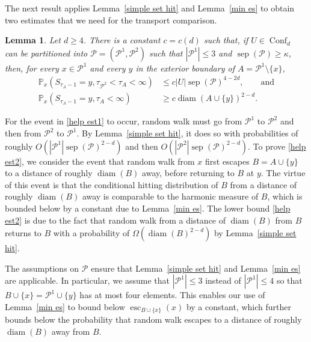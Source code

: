 \documentclass[11pt,reqno]{amsart}
\newtheorem{lemma}{Lemma}[section]
\theoremstyle{definition}
\numberwithin{equation}{section}
\renewcommand{\P}{\mathbb{P}}
\newcommand{\1}{\mathbf{1}}
\DeclareMathOperator{\diam}{diam}
\DeclareMathOperator{\sep}{sep}
\DeclareMathOperator{\Es}{esc}
\DeclareMathOperator{\Conf}{\mathrm{Conf}}
\begin{document}
The next result applies Lemma~\ref{simple set hit} and Lemma~\ref{min es} to obtain two estimates that we need for the transport comparison.

\begin{lemma}\label{lemma help est}
Let $d \geq 4$. There is a constant $c = c(d)$ such that, if $U \in \Conf_d$ can be partitioned into $\mathcal{P} = (\mathcal{P}^1, \mathcal{P}^2)$ such that $|\mathcal{P}^1| \leq 3$ and $\sep (\mathcal{P}) \geq \kappa$, then, for every $x \in \mathcal{P}^1$ and every $y$ in the exterior boundary of $A = \mathcal{P}^1 {\setminus} \{x\}$, 
\begin{align}
\P_x (S_{\tau_A - 1} = y, \tau_{\mathcal{P}^2} < \tau_A < \infty) &\leq c |U| \sep (\mathcal{P})^{4-2d}, \quad \quad \text{and} \label{help est1}\\ 
\P_x (S_{\tau_A - 1} = y, \tau_A < \infty) &\geq c \diam (A \cup \{y\})^{2-d}. \label{help est2}
\end{align}
\end{lemma}  

For the event in \eqref{help est1} to occur, random walk must go from $\mathcal{P}^1$ to $\mathcal{P}^2$ and then from $\mathcal{P}^2$ to $\mathcal{P}^1$. By Lemma~\ref{simple set hit}, it does so with probabilities of roughly $O\left(|\mathcal{P}^1| \sep (\mathcal{P})^{2-d} \right)$ and then $O\left( |\mathcal{P}^2| \sep (\mathcal{P})^{2-d} \right)$. To prove \eqref{help est2}, we consider the event that random walk from $x$ first escapes $B = A \cup \{y\}$ to a distance of roughly $\diam (B)$ away, before returning to $B$ at $y$. The virtue of this event is that the conditional hitting distribution of $B$ from a distance of roughly $\diam (B)$ away is comparable to the harmonic measure of $B$, which is bounded below by a constant due to Lemma~\ref{min es}. The lower bound \eqref{help est2} is due to the fact that random walk from a distance of $\diam (B)$ from $B$ returns to $B$ with a probability of $\Omega (\diam (B)^{2-d})$ by Lemma~\ref{simple set hit}.

The assumptions on $\mathcal{P}$ ensure that Lemma~\ref{simple set hit} and Lemma~\ref{min es} are applicable. In particular, we assume that $|\mathcal{P}^1| \leq 3$ instead of $|\mathcal{P}^1| \leq 4$ so that $B \cup \{x\} = \mathcal{P}^1 \cup \{y\}$ has at most four elements. This enables our use of Lemma~\ref{min es} to bound below $\Es_{B \cup \{x\}} (x)$ by a constant, which further bounds below the probability that random walk escapes to a distance of roughly $\diam (B)$ away from $B$.
\end{document}
